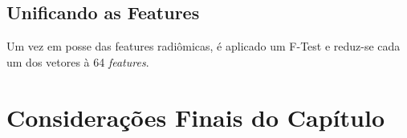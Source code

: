 \subsection{Unificando as Features}
\label{subsec:cap4_unificando_features}

Um vez em posse das features radiômicas, é aplicado um F-Test e reduz-se cada um dos vetores à 64 \textit{features}.

\section{Considerações Finais do Capítulo}
\label{sec:cap4_consideracoes_finais}

\lipsum[1-4]